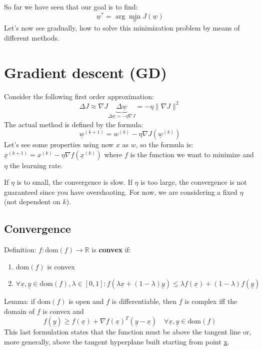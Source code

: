 So far we have seen that our goal is to find:
\[
    \underline{w}^* = \arg \min_{\underline{w}} J(\underline{w})   
\]
Let's now see gradually, how to solve this minimization problem by means of different methods.

\section{Gradient descent (GD)}
Consider the following first order approximation:
\[
    \Delta J \approx \nabla J \underbrace{\Delta \underline{w}}_{\Delta \underline{w} = -\eta\nabla J} = -\eta \|\nabla J\|^2    
\]
The actual method is defined by the formula:
\[
     \underline{w}^{(k+1)}= w^{(k)}- \eta\nabla J(\underline{w}^{(k)})   
\]
Let's see some properties using now $x$ as $w$, so the formula is: $ \underline{x}^{(k+1)}= x^{(k)}- \eta\nabla f(\underline{x}^{(k)}) $ where $f$ is the function we want to minimize and $\eta$ the learning rate.

If $\eta$ is to small, the convergence is slow. If $\eta$ is too large, the convergence is not guaranteed since you have overshooting. For now, we are considering a fixed $\eta$ (not dependent on $k$).

\subsection{Convergence}
Definition: $f: \text{dom}(f) \to \mathbb{R}$ is \textbf{convex} if:
\begin{enumerate}[i]
    \item $\text{dom}(f)$ is convex
    \item $\forall \underline{x}, \underline{y} \in \text{dom}(f), \lambda \in [0,1]: f(\lambda \underline{x} + (1-\lambda)\underline{y}) \leq \lambda f(\underline{x}) + (1-\lambda)f(\underline{y})$
\end{enumerate} 
Lemma: if $\text{dom}(f)$ is open and $f$ is differentiable, then $f$ is complex iff the domain of $f$ is convex and 
\[
    f(\underline{y}) \geq f(\underline{x}) + \nabla f(\underline{x})^T(\underline{y}-\underline{x}) \quad \forall \underline{x}, \underline{y} \in \text{dom}(f)    
\]
This last formulation states that the function must be above the tangent line or, more generally, above the tangent hyperplane built starting from point \underline{x}.\\


